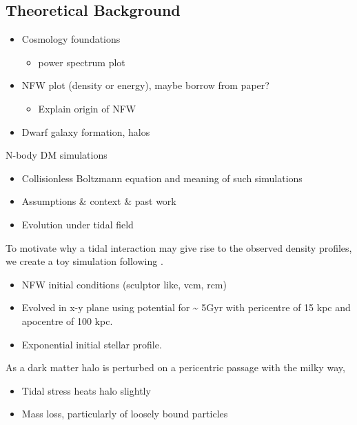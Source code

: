\subsection{Theoretical Background}\label{theoretical-background}

\begin{itemize}
\tightlist
\item
  Cosmology foundations

  \begin{itemize}
  \tightlist
  \item
    power spectrum plot
  \end{itemize}
\item
  NFW plot (density or energy), maybe borrow from paper?

  \begin{itemize}
  \tightlist
  \item
    Explain origin of NFW
  \end{itemize}
\item
  Dwarf galaxy formation, halos
\end{itemize}

N-body DM simulations

\begin{itemize}
\tightlist
\item
  Collisionless Boltzmann equation and meaning of such simulations
\item
  Assumptions \& context \& past work
\item
  Evolution under tidal field
\end{itemize}

To motivate why a tidal interaction may give rise to the observed
density profiles, we create a toy simulation following \citet{PNM2008}.

\begin{itemize}
\item
  NFW initial conditions (sculptor like, vcm, rcm)
\item
  Evolved in x-y plane using \citet{EP2020} potential for
  \textasciitilde{} 5Gyr with pericentre of 15 kpc and apocentre of 100
  kpc.
\item
  Exponential initial stellar profile.
\end{itemize}

As a dark matter halo is perturbed on a pericentric passage with the
milky way,

\begin{itemize}
\tightlist
\item
  Tidal stress heats halo slightly
\item
  Mass loss, particularly of loosely bound particles
\end{itemize}

